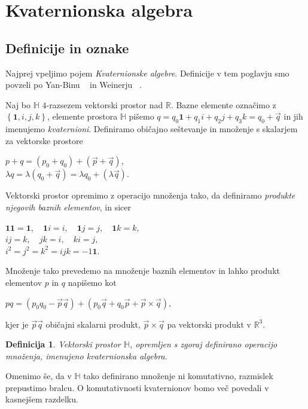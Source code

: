 \documentclass[a4paper,12pt]{article}
\def\R{\mathbb{R}} %
\def\H{\mathbb{H}} %
\def\1{\textbf{1}}
\newtheorem{definicija}{Definicija}
\begin{document}

\section{Kvaternionska algebra}
\subsection{Definicije in oznake}

Najprej vpeljimo pojem \emph{Kvaternionske algebre}. Definicije v tem poglavju smo povzeli po Yan-Binu ~\cite{jia2008quaternions} in Weinerju ~\cite{weiner2005quaternions}.

Naj bo $\H$ $4$-razsezem vektorski prostor nad $\R$. Bazne elemente označimo z $\left\{\1, i, j, k\right\}$,
elemente prostora $\H$ pišemo $q = q_{0}\1 + q_{1}i + q_{2}j + q_{3}k = q_{0} + \vec{q}$ in jih imenujemo \emph{kvaternioni}. Definiramo običajno seštevanje in množenje s skalarjem za vektorske prostore
\begin{center}
   $p + q = \left( p_{0} + q_{0} \right) + \left( \vec{p} + \vec{q} \right)$, \\
   $ \lambda q = \lambda \left(q_{0} + \vec{q} \right) = \lambda q_{0} + \left(\lambda \vec{q}\right) $.
\end{center}
\noindent Vektorski prostor opremimo z operacijo množenja tako, da definiramo \emph{produkte njegovih baznih elementov}, in sicer
\begin{center}
   $\1 \1 = \1, \hspace{1em}  \1i = i, \hspace{1em} \1j = j, \hspace{1em} \1k = k,$\\
   $ij = k, \hspace{1em} jk = i, \hspace{1em} ki = j,$\\
   $i^2 = j^2 = k^2 = ijk = -1\1$.
\end{center}
Množenje tako prevedemo na množenje baznih elementov in lahko produkt elementov $p$ in $q$ napišemo kot
\begin{center}
   $pq = (p_{0} q_{0} - \vec{p} \vec{q}) + (p_{0}\vec{q} + q_{0}\vec{p} + \vec{p}\times\vec{q})$,
\end{center}
kjer je $\vec{p}\vec{q}$ običajni skalarni produkt, $\vec{p} \times \vec{q}$ pa vektorski produkt v $\R^3$.
\begin{definicija}
   Vektorski prostor $\H$, opremljen s zgoraj definirano operacijo množenja, imenujeno \emph{kvaternionska algebra}.
\end{definicija}
Omenimo še, da v $\H$ tako definirano množenje ni komutativno, razmislek prepustimo bralcu. O komutativnosti kvaternionov bomo več povedali v kasnejšem razdelku. 
\end{document}
